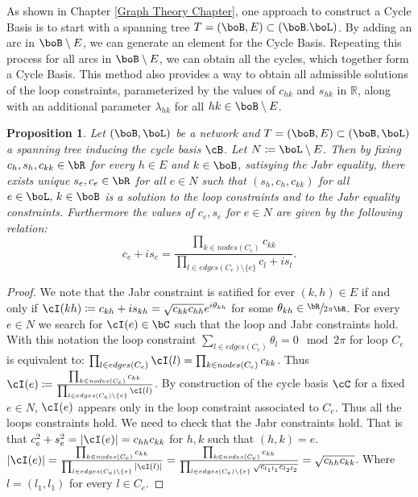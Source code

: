 \documentclass[11pt,a4paper,oneside,openany]{book}
\newtheorem{prop}[theorem]{Proposition}
\numberwithin{definition}{section}
\numberwithin{theorem}{section}
\numberwithin{problem}{section}
\begin{document}
As shown in Chapter \ref{Graph Theory Chapter}, one approach to construct a Cycle Basis is to start with a spanning tree $T = (\boB,E) \subset (\boB. \boL)$. By adding an arc in $\boB \setminus E$, we can generate an element for the Cycle Basis. Repeating this process for all arcs in $\boB \setminus E$, we can obtain all the cycles, which together form a Cycle Basis. This method also provides a way to obtain all admissible solutions of the loop constraints, parameterized by the values of $c_{hk}$ and $s_{hk}$ in $\mathbb{R}$, along with an additional parameter $\lambda_{hk}$ for all $hk \in \boB \setminus E$.
\begin{prop}
\label{prop: loop constraints solution}
Let $(\boB,\boL)$ be a network and \( T = (\boB, E) \subset (\boB,\boL)\) a spanning tree inducing the cycle basis $\cB$. Let $N \coloneqq \boL \setminus E$. Then by fixing \(c_h,s_h,c_{kk} \in \bR\) for every $h \in E$ and $k \in \boB$, satisying the Jabr equality, there exists unique $s_e,c_e \in \bR$ for all $e \in N$ such that \((s_h,c_h,c_{kk})\) for all $e \in \boL, \, k \in \boB$ is a solution to the loop constraints and to the Jabr equality constraints. Furthermore the values of $c_e,s_e$ for $e \in N$ are given by the following relation:
\begin{equation}
    c_e + is_e = \frac{\prod_{k \in nodes(C_e)}c_{kk}}{\prod_{l \in edges(C_e)\setminus\{e\}}c_l + is_l}.
\end{equation}
\end{prop}

\begin{proof}
    We note that the Jabr constraint is satified for ever $(k,h) \in E$ if and only if $ \cI(kh) \coloneqq c_{kh} + is_{kh} = \sqrt{c_{kk}c_{hh}}e^{i\theta_{kh}}$ for some $\theta_{kh} \in \sfrac{\bR}{2\pi\bR}$. For every $e \in N$ we search for $\cI(e) \in \bC$ such that the loop and Jabr constraints hold. With this notation the loop constraint $\sum_{l \in edges(C_e)}\theta_l = 0 \mod 2\pi$ for loop $C_e$ is equivalent to: $\prod_{l \in edges(C_e)}\cI(l) = \prod_{k \in nodes(C_e)}c_{kk}$. Thus $\cI(e) \coloneqq \frac{\prod_{k \in nodes(C_e)}c_{kk}}{\prod_{l \in edges(C_e)\setminus\{e\}}\cI(l)}$. By construction of  the cycle basis $\cC$ for a fixed $e \in N$, $\cI(e)$ appears only in the loop constraint associated to $C_e$. Thus all the loops constraints hold. We need to check that the Jabr constraints hold. That is that $c_{e}^2+s_{e}^2 = |\cI(e)| = c_{hh}c_{kk}$ for $h,k$ such that $(h,k) = e$. \(|\cI(e)| =  \frac{\prod_{k \in nodes(C_e)}c_{kk}}{\prod_{l \in edges(C_e)\setminus\{e\}}|\cI(l)|} = \frac{\prod_{k \in nodes(C_e)}c_{kk}}{\prod_{l \in edges(C_e)\setminus\{e\}}\sqrt{c_{l_1l_1}c_{l_2l_2}}}= \sqrt{c_{hh}c_{kk}}\). Where  $l = (l_1,l_1)$ for every $l \in C_e$.
\end{proof}
\end{document}
